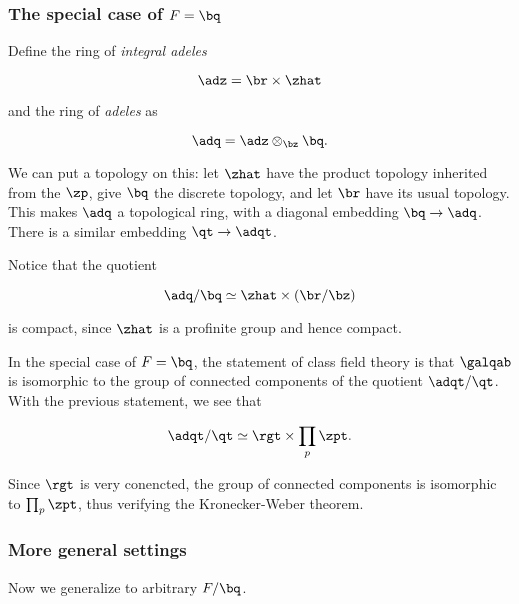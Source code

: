 \subsubsection{The special case of $F=\bq$}

Define the ring of \textit{integral adeles}

\[ \adz = \br \times \zhat \]

and the ring of \textit{adeles} as

\[ \adq = \adz \otimes_\bz \bq. \]

We can put a topology on this: let $\zhat$ have the product topology inherited
from the $\zp$, give $\bq$ the discrete topology, and let $\br$ have its usual
topology. This makes $\adq$ a topological ring, with a diagonal embedding
$\bq\to\adq$. There is a similar embedding $\qt \to \adqt$.

Notice that the quotient

\[ \adq/\bq \simeq \zhat \times (\br/\bz) \]

is compact, since $\zhat$ is a profinite group and hence compact.

In the special case of $F=\bq$, the statement of class field theory is that
$\galqab$ is isomorphic to the group of connected components of the quotient
$\adqt/\qt$. With the previous statement, we see that

\[ \adqt/
  \qt
  \simeq \rgt \times \prod_p \zpt. \]

Since $\rgt$ is very conencted, the group of connected components is isomorphic
to $\prod_p \zpt$, thus verifying the Kronecker-Weber theorem.

\subsubsection{More general settings}

Now we generalize to arbitrary $F/\bq$.


